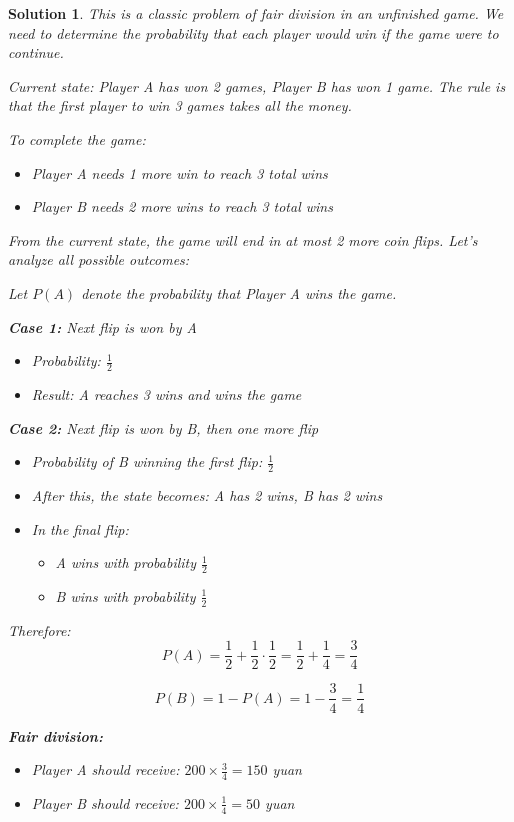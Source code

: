 \documentclass[12pt]{amsart}
\newtheorem*{solution}{Solution}
\begin{document}
\begin{solution}
This is a classic problem of fair division in an unfinished game. We need to determine the probability that each player would win if the game were to continue.

Current state: Player A has won 2 games, Player B has won 1 game. The rule is that the first player to win 3 games takes all the money.

To complete the game:
\begin{itemize}
    \item Player A needs 1 more win to reach 3 total wins
    \item Player B needs 2 more wins to reach 3 total wins
\end{itemize}

From the current state, the game will end in at most 2 more coin flips. Let's analyze all possible outcomes:

Let $P(A)$ denote the probability that Player A wins the game.

\textbf{Case 1:} Next flip is won by A
\begin{itemize}
    \item Probability: $\frac{1}{2}$
    \item Result: A reaches 3 wins and wins the game
\end{itemize}

\textbf{Case 2:} Next flip is won by B, then one more flip
\begin{itemize}
    \item Probability of B winning the first flip: $\frac{1}{2}$
    \item After this, the state becomes: A has 2 wins, B has 2 wins
    \item In the final flip:
    \begin{itemize}
        \item A wins with probability $\frac{1}{2}$
        \item B wins with probability $\frac{1}{2}$
    \end{itemize}
\end{itemize}

Therefore:
$$P(A) = \frac{1}{2} + \frac{1}{2} \cdot \frac{1}{2} = \frac{1}{2} + \frac{1}{4} = \frac{3}{4}$$

$$P(B) = 1 - P(A) = 1 - \frac{3}{4} = \frac{1}{4}$$

\textbf{Fair division:}
\begin{itemize}
    \item Player A should receive: $200 \times \frac{3}{4} = 150$ yuan
    \item Player B should receive: $200 \times \frac{1}{4} = 50$ yuan
\end{itemize}
\end{solution}
\end{document}
